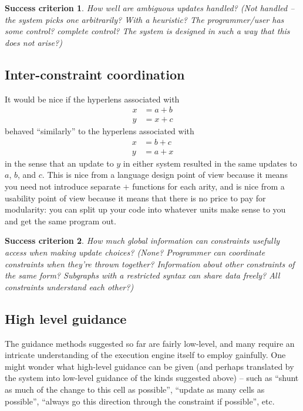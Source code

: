 \documentclass{article}
\newtheorem{success}{Success criterion}
\begin{document}
\begin{success}
    How well are ambiguous updates handled? (Not handled -- the system picks
    one arbitrarily? With a heuristic? The programmer/user has some control?
    complete control? The system is designed in such a way that this does
    not arise?)
\end{success}

\subsection{Inter-constraint coordination}
It would be nice if the hyperlens associated with
\begin{align*}
    x &= a+b \\
    y &= x+c
\end{align*}
behaved ``similarly'' to the hyperlens associated with
\begin{align*}
    x &= b+c \\
    y &= a+x
\end{align*}
in the sense that an update to $y$ in either system resulted in the same
updates to $a$, $b$, and $c$. This is nice from a language design point of
view because it means you need not introduce separate $+$ functions for each
arity, and is nice from a usability point of view because it means that
there is no price to pay for modularity: you can split up your code into
whatever units make sense to you and get the same program out.

\begin{success}
    How much global information can constraints usefully access when making
    update choices? (None? Programmer can coordinate constraints when
    they're thrown together? Information about other constraints of the same
    form? Subgraphs with a restricted syntax can share data freely? All
    constraints understand each other?)
\end{success}

\subsection{High level guidance}
The guidance methods suggested so far are fairly low-level, and many require
an intricate understanding of the execution engine itself to employ
gainfully. One might wonder what high-level guidance can be given (and
perhaps translated by the system into low-level guidance of the kinds
suggested above) -- such as ``shunt as much of the change to this cell as
possible'', ``update as many cells as possible'', ``always go this direction
through the constraint if possible'', etc.
\end{document}
